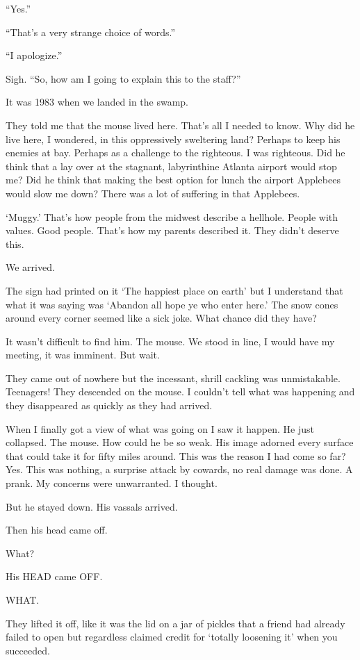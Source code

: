 ``Yes.''

``That’s a very strange choice of words.''

``I apologize.''

Sigh.  ``So, how am I going to explain this to the staff?''

\secdiv

It was 1983 when we landed in the swamp.

They told me that the mouse lived here. That’s all I needed to know. Why did he live here, I wondered, in this oppressively sweltering land? Perhaps to keep his enemies at bay. Perhaps as a challenge to the righteous. I was righteous. Did he think that a lay over at the stagnant, labyrinthine Atlanta airport would stop me? Did he think that making the best option for lunch the airport Applebees would slow me down? There was a lot of suffering in that Applebees.

‘Muggy.’ That’s how people from the midwest describe a hellhole. People with values. Good people. That’s how my parents described it. They didn’t deserve this.

We arrived.

The sign had printed on it ‘The happiest place on earth’ but I understand that what it was saying was ‘Abandon all hope ye who enter here.’ The snow cones around every corner seemed like a sick joke. What chance did they have?

It wasn’t difficult to find him. The mouse. We stood in line, I would have my meeting, it was imminent. But wait.

They came out of nowhere but the incessant, shrill cackling was unmistakable. Teenagers! They descended on the mouse. I couldn’t tell what was happening and they disappeared as quickly as they had arrived.

When I finally got a view of what was going on I saw it happen. He just collapsed. The mouse. How could he be so weak. His image adorned every surface that could take it for fifty miles around. This was the reason I had come so far? Yes. This was nothing, a surprise attack by cowards, no real damage was done. A prank. My concerns were unwarranted. I thought.

But he stayed down. His vassals arrived.

Then his head came off.

What?

His HEAD came OFF.

WHAT.

They lifted it off, like it was the lid on a jar of pickles that a friend had already failed to open but regardless claimed credit for ‘totally loosening it’ when you succeeded.

